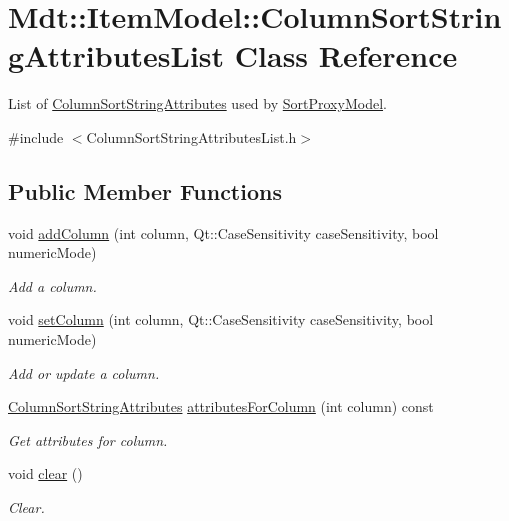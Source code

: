 \hypertarget{class_mdt_1_1_item_model_1_1_column_sort_string_attributes_list}{}\section{Mdt\+:\+:Item\+Model\+:\+:Column\+Sort\+String\+Attributes\+List Class Reference}
\label{class_mdt_1_1_item_model_1_1_column_sort_string_attributes_list}


List of \hyperlink{class_mdt_1_1_item_model_1_1_column_sort_string_attributes}{Column\+Sort\+String\+Attributes} used by \hyperlink{class_mdt_1_1_item_model_1_1_sort_proxy_model}{Sort\+Proxy\+Model}.  




{\ttfamily \#include $<$Column\+Sort\+String\+Attributes\+List.\+h$>$}

\subsection*{Public Member Functions}
\begin{DoxyCompactItemize}
\item 
void \hyperlink{class_mdt_1_1_item_model_1_1_column_sort_string_attributes_list_a04f3a43c8bedc1b51b1be75a0d1c9ce1}{add\+Column} (int column, Qt\+::\+Case\+Sensitivity case\+Sensitivity, bool numeric\+Mode)
\begin{DoxyCompactList}\small\item\em Add a column. \end{DoxyCompactList}\item 
void \hyperlink{class_mdt_1_1_item_model_1_1_column_sort_string_attributes_list_adfa7544e3f360bf6fb736bb46764262a}{set\+Column} (int column, Qt\+::\+Case\+Sensitivity case\+Sensitivity, bool numeric\+Mode)
\begin{DoxyCompactList}\small\item\em Add or update a column. \end{DoxyCompactList}\item 
\hyperlink{class_mdt_1_1_item_model_1_1_column_sort_string_attributes}{Column\+Sort\+String\+Attributes} \hyperlink{class_mdt_1_1_item_model_1_1_column_sort_string_attributes_list_ad880dec74255cdfe6d2c51cbb747c551}{attributes\+For\+Column} (int column) const 
\begin{DoxyCompactList}\small\item\em Get attributes for column. \end{DoxyCompactList}\item 
void \hyperlink{class_mdt_1_1_item_model_1_1_column_sort_string_attributes_list_a63ffd651a7f5969fb9c682072a421ade}{clear} ()\hypertarget{class_mdt_1_1_item_model_1_1_column_sort_string_attributes_list_a63ffd651a7f5969fb9c682072a421ade}{}\label{class_mdt_1_1_item_model_1_1_column_sort_string_attributes_list_a63ffd651a7f5969fb9c682072a421ade}

\begin{DoxyCompactList}\small\item\em Clear. \end{DoxyCompactList}\end{DoxyCompactItemize}


